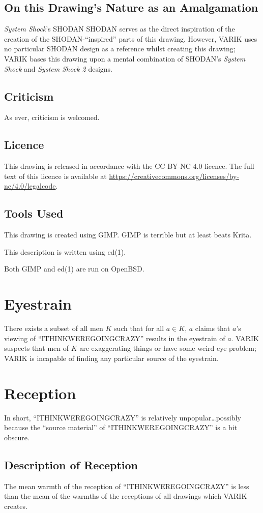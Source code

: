 \documentclass{report}
\begin{document}
\subsection{On this Drawing's Nature as an Amalgamation}
\textit{System Shock}'s SHODAN SHODAN serves as the direct inspiration of the creation of the SHODAN-``inspired'' parts of this drawing.  However, VARIK uses no particular SHODAN design as a reference whilst creating this drawing; VARIK bases this drawing upon a mental combination of SHODAN's \textit{System Shock} and \textit{System Shock 2} designs.
\subsection{Criticism}
As ever, criticism is welcomed.
\subsection{Licence}
This drawing is released in accordance with the CC BY-NC 4.0 licence.  The full text of this licence is available at \url{https://creativecommons.org/licenses/by-nc/4.0/legalcode}.
\subsection{Tools Used}
This drawing is created using GIMP\@.  GIMP is terrible but at least beats Krita.

This description is written using ed(1).

Both GIMP and ed(1) are run on OpenBSD\@.
\section{Eyestrain}
There exists a subset of all men $K$ such that for all $a \in K$, $a$ claims that $a$'s viewing of ``ITHINKWEREGOINGCRAZY'' results in the eyestrain of $a$.  VARIK suspects that men of $K$ are exaggerating things or have some weird eye problem; VARIK is incapable of finding any particular source of the eyestrain.
\section{Reception}
In short, ``ITHINKWEREGOINGCRAZY'' is relatively unpopular\ldots possibly because the ``source material'' of ``ITHINKWEREGOINGCRAZY'' is a bit obscure.
\subsection{Description of Reception}
The mean warmth of the reception of ``ITHINKWEREGOINGCRAZY'' is less than the mean of the warmths of the receptions of all drawings which VARIK creates.
\end{document}
